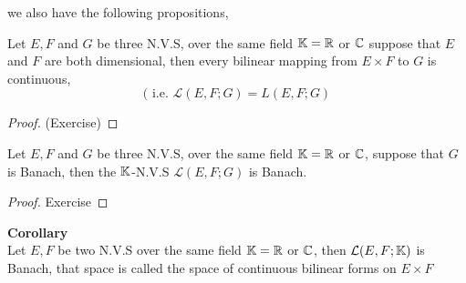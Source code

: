 we also have the following propositions, 
\begin{theorem}[]
Let $E,F $ and $G $ be three N.V.S, over the same field $\mathbb{K} = \mathbb{R}  $ or $\mathbb{C}  $  
suppose that $E $ and $F $ are both dimensional, 
then every bilinear mapping from $E \times F  $  to $G $ is continuous, 
\[
	( \text{ i.e. }  \mathcal{L} (E,F;G) = 
	L(E,F;G) 
\]
\end{theorem}
\begin{proof} 
	(Exercise)
\end{proof}
\begin{theorem}[]
Let $E,F $ and $G $ be three N.V.S, over the same field 
$\mathbb{K} = \mathbb{R}  $ or $\mathbb{C}  $, suppose that $G $ is Banach, then the 
$\mathbb{K} $-N.V.S $\mathcal{L} (E,F;G) $ is Banach.
\end{theorem}
\begin{proof}
Exercise
\end{proof}
\textbf{Corollary }  \\
Let $E ,F$ be two N.V.S over the same field $\mathbb{K} = \mathbb{R}  $ or $\mathbb{C}  $, then 
$\mathcal{L} (E,F;\mathbb{K})  $  is Banach, that space is called the space of continuous
bilinear forms on $E \times F  $ 
